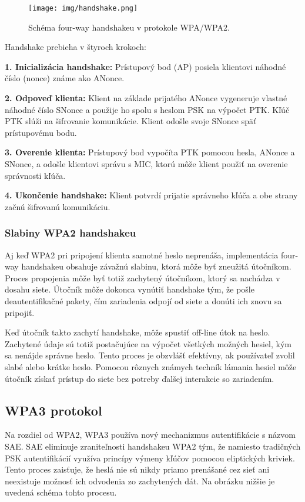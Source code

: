 \documentclass[12pt, twoside]{book}
\begin{document}
\begin{figure}[H] 
    \centering
    \texttt{[image: img/handshake.png]}
    \caption{Schéma four-way handshakeu v protokole WPA/WPA2.}
    \label{fig:handshake}
\end{figure}

Handshake prebieha v štyroch krokoch:

\textbf{1. Inicializácia handshake:} Prístupový bod (AP) posiela klientovi náhodné číslo (nonce) známe ako ANonce.

\textbf{2. Odpoveď klienta:} Klient na základe prijatého ANonce vygeneruje vlastné náhodné číslo SNonce a použije ho spolu s heslom PSK na výpočet PTK. Kľúč PTK slúži na šifrovanie komunikácie. Klient odošle svoje SNonce späť prístupovému bodu.

\textbf{3. Overenie klienta:} Prístupový bod vypočíta PTK pomocou hesla, ANonce a SNonce, a odošle klientovi správu s MIC, ktorú môže klient použiť na overenie správnosti kľúča.

\textbf{4. Ukončenie handshake:} Klient potvrdí prijatie správneho kľúča a obe strany začnú šifrovanú komunikáciu.


\subsubsection{Slabiny WPA2 handshakeu}
Aj keď WPA2 pri pripojení klienta samotné heslo neprenáša, implementácia four-way handshakeu obsahuje závažnú slabinu, ktorá môže byť zneužitá útočníkom. Proces propojenia môže byť totiž zachytený útočníkom, ktorý sa nachádza v dosahu siete. Útočník môže dokonca vynútiť handshake tým, že pošle deautentifikačné pakety, čím zariadenia odpojí od siete a donúti ich znovu sa pripojiť.

Keď útočník takto zachytí handshake, môže spustiť off-line útok na heslo. Zachytené údaje sú totiž postačujúce na výpočet všetkých možných hesiel, kým sa nenájde správne heslo. Tento proces je obzvlášť efektívny, ak používateľ zvolil slabé alebo krátke heslo. Pomocou rôznych známych techník lámania hesiel môže útočník získať prístup do siete bez potreby ďalšej interakcie so zariadením.

\subsection{WPA3 protokol}
Na rozdiel od WPA2, WPA3 používa nový mechanizmus autentifikácie s názvom SAE. SAE eliminuje zraniteľnosti handshakeu WPA2 tým, že namiesto tradičných PSK autentifikácií využíva princípy výmeny kľúčov pomocou eliptických kriviek. Tento proces zaisťuje, že heslá nie sú nikdy priamo prenášané cez sieť ani neexistuje možnosť ich odvodenia zo zachytených dát.
Na obrázku nižšie je uvedená schéma tohto procesu.
\end{document}

